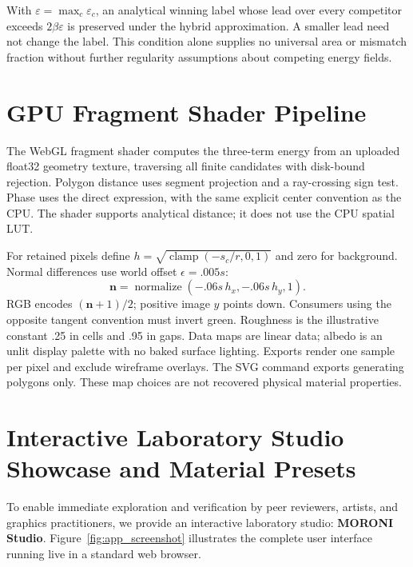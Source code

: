 \documentclass[sigconf,nonacm]{acmart}
\begin{document}
With $\varepsilon=\max_c\varepsilon_c$, an analytical winning label whose
lead over every competitor exceeds $2\beta\varepsilon$ is preserved under
the hybrid approximation. A smaller lead need not change the label. This
condition alone supplies no universal area or mismatch fraction without
further regularity assumptions about competing energy fields.

\section{GPU Fragment Shader Pipeline}
\label{sec:appendix_shader}

The WebGL fragment shader computes the three-term energy from an uploaded float32 geometry
texture, traversing all finite candidates with disk-bound rejection. Polygon
distance uses segment projection and a ray-crossing sign test. Phase uses
the direct expression, with the same explicit center convention as the CPU.
The shader supports analytical distance; it does not use the CPU spatial LUT.

For retained pixels define $h=\sqrt{\operatorname{clamp}(-s_c/r,0,1)}$ and
zero for background. Normal differences use world offset $\epsilon=.005s$:
\begin{equation}
\mathbf n=\operatorname{normalize}(-.06s\,h_x,-.06s\,h_y,1).
\end{equation}
RGB encodes $(\mathbf n+1)/2$; positive image $y$ points down. Consumers
using the opposite tangent convention must invert green. Roughness is the
illustrative constant .25 in cells and .95 in gaps. Data maps are linear
data; albedo is an unlit display palette with no baked surface lighting.
Exports render one sample per pixel and exclude wireframe overlays. The
SVG command exports generating polygons only. These map choices are not
recovered physical material properties.

\section{Interactive Laboratory Studio Showcase and Material Presets}
\label{sec:appendix_studio}

To enable immediate exploration and verification by peer reviewers, artists,
and graphics practitioners, we provide an interactive laboratory studio:
\textbf{MORONI Studio}. Figure~\ref{fig:app_screenshot} illustrates the complete
user interface running live in a standard web browser.
\end{document}

